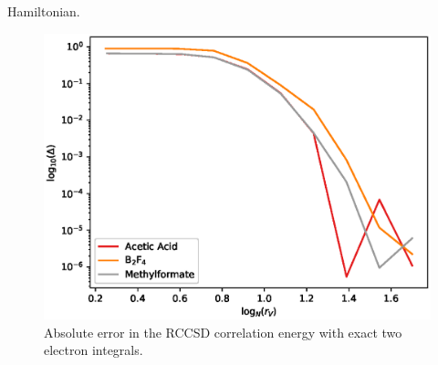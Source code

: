 Hamiltonian.
%
\begin{figure}[tb]
\includegraphics[width=\columnwidth]{figures/thc_rccsd/cc_err_ao_full_amps_only}
\caption{Absolute error in the RCCSD correlation energy with exact two
electron integrals.
\label{fig:cc_err_ao_full_amps_only}}
\end{figure}
%
